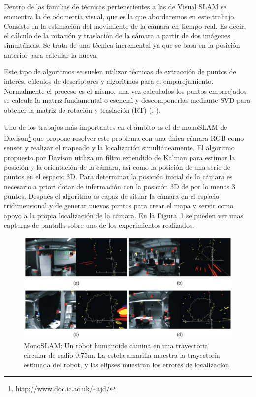 Dentro de las familias de técnicas pertenecientes a las de Visual SLAM se encuentra la de odometría visual, que es la que abordaremos en este trabajo. Consiste en la estimación del movimiento de la cámara en tiempo real. Es decir, el cálculo de la rotación y traslación de la cámara a partir de dos imágenes simultáneas. Se trata de una técnica incremental ya que se basa en la posición anterior para calcular la nueva.

Este tipo de algoritmos se suelen utilizar técnicas de extracción de puntos de interés, cálculos de descriptores y algoritmos para el emparejamiento. Normalmente el proceso es el mismo, una vez calculados los puntos emparejados se calcula la matriz fundamental o esencial y descomponerlas mediante SVD para obtener la matriz de rotación y traslación (RT) (\cite{Reference3}. \cite{Reference4}).

Uno de los trabajos más importantes en el ámbito es el de monoSLAM de Davison\footnote{http://www.doc.ic.ac.uk/\textasciitilde ajd/} \parencite{Reference5} que propone resolver este problema con una única cámara RGB como sensor y realizar el mapeado y la localización simultáneamente. El algoritmo propuesto por Davison utiliza un filtro extendido de Kalman para estimar la posición y la orientación de la cámara, así como la posición de una serie de puntos en el espacio 3D. Para determinar la posición inicial de la cámara es necesario a priori dotar de información con la posición 3D de por lo menos 3 puntos. Después el algoritmo es capaz de situar la cámara en el espacio tridimensional y de generar nuevos puntos para crear el mapa y servir como apoyo a la propia localización de la cámara. En la Figura~\ref{fig:Monoslam} se pueden ver unas capturas de pantalla sobre uno de los experimientos realizados.

\begin{figure}[th]
\centering
\includegraphics[scale=0.35]{Figures/monoslam.png}
\decoRule
\caption[MonoSlam]{MonoSLAM: Un robot humanoide camina en una trayectoria circular de radio 0.75m. La estela amarilla muestra la trayectoria estimada del robot, y las elipses muestran los errores de localización.}
\label{fig:Monoslam}
\end{figure}

